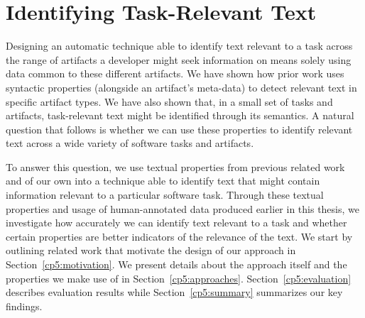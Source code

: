 \setcounter{chapter}{4}
\setcounter{rq}{1}


\chapter{Identifying Task-Relevant Text}
\label{ch:identifying}



Designing an automatic technique able to identify text relevant to a task across the range of artifacts a developer might seek information on means solely using data common to these different artifacts.
We have shown how  prior work uses syntactic properties (alongside an artifact's meta-data)
to detect relevant text in specific artifact types.
We have also shown that, in a small set of tasks and artifacts, task-relevant text might be identified through its semantics.
A natural question that follows is whether we can use these properties to identify relevant text across a wide variety of software tasks and artifacts.




To answer this question, we use textual properties from previous related work and of our own 
into a technique able to identify text that might contain information relevant to a particular software task.
Through these textual properties and usage of human-annotated data produced earlier in this thesis, we 
investigate how accurately we can identify text relevant to a task and whether certain properties are better indicators of the relevance of the text.
We start by outlining related work that motivate the design of our approach in Section~\ref{cp5:motivation}.
We present details about the approach itself and the properties we make use of in Section~\ref{cp5:approaches}.
Section~\ref{cp5:evaluation} describes evaluation results while
Section~\ref{cp5:summary} summarizes our key findings.









